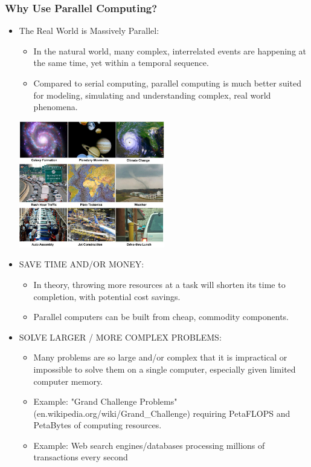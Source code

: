 \documentclass[10pt,t]{beamer}
\begin{document}
\begin{frame}[allowframebreaks,c]
  \frametitle{Why Use Parallel Computing?}
  \begin{itemize}
  \item The Real World is Massively Parallel:
    \begin{itemize}
    \item In the natural world, many complex, interrelated events are happening at the same time, yet within a temporal sequence.
    \item Compared to serial computing, parallel computing is much better suited for modeling, simulating and understanding complex, real world phenomena.
    \end{itemize}
    \begin{center}
      \includegraphics[width=0.5\textwidth]{./realworldcollage}
    \end{center}
    \framebreak
  \item SAVE TIME AND/OR MONEY:
    \begin{itemize}
    \item In theory, throwing more resources at a task will shorten its time to completion, with potential cost savings.
    \item Parallel computers can be built from cheap, commodity components.
    \end{itemize}
  \item SOLVE LARGER / MORE COMPLEX PROBLEMS:
    \begin{itemize}
    \item Many problems are so large and/or complex that it is impractical or impossible to solve them on a single computer, especially given limited computer memory.
    \item Example: "Grand Challenge Problems" (en.wikipedia.org/wiki/Grand\_Challenge) requiring PetaFLOPS and PetaBytes of computing resources.
    \item Example: Web search engines/databases processing millions of transactions every second

\end{itemize}
\end{itemize}
\end{frame}
\end{document}
